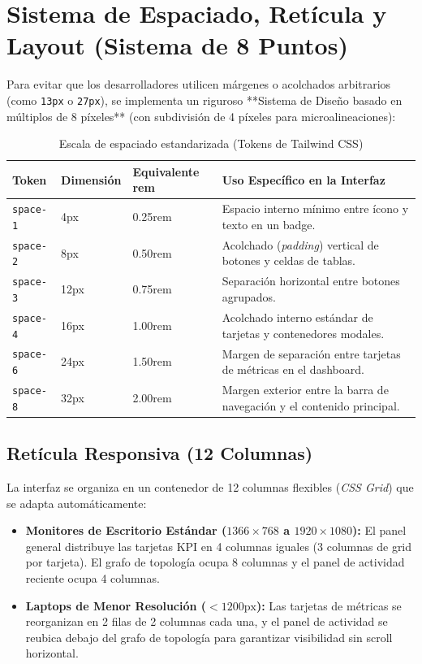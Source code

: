 \documentclass[12pt,a4paper]{report}
\begin{document}
\newpage
\chapter{Sistema de Espaciado, Retícula y Layout (Sistema de 8 Puntos)}

Para evitar que los desarrolladores utilicen márgenes o acolchados arbitrarios (como \texttt{13px} o \texttt{27px}), se implementa un riguroso **Sistema de Diseño basado en múltiplos de 8 píxeles** (con subdivisión de 4 píxeles para microalineaciones):

\begin{table}[htbp]
\centering
\caption{Escala de espaciado estandarizada (Tokens de Tailwind CSS)}\label{tab:espaciado}
\small
\begin{tabularx}{\textwidth}{p{2.2cm} p{2.2cm} p{3.0cm} X}
\toprule
\textbf{Token} & \textbf{Dimensión} & \textbf{Equivalente rem} & \textbf{Uso Específico en la Interfaz} \\
\midrule
\texttt{space-1} & 4px & 0.25rem & Espacio interno mínimo entre ícono y texto en un badge. \\
\midrule
\texttt{space-2} & 8px & 0.50rem & Acolchado (\textit{padding}) vertical de botones y celdas de tablas. \\
\midrule
\texttt{space-3} & 12px & 0.75rem & Separación horizontal entre botones agrupados. \\
\midrule
\texttt{space-4} & 16px & 1.00rem & Acolchado interno estándar de tarjetas y contenedores modales. \\
\midrule
\texttt{space-6} & 24px & 1.50rem & Margen de separación entre tarjetas de métricas en el dashboard. \\
\midrule
\texttt{space-8} & 32px & 2.00rem & Margen exterior entre la barra de navegación y el contenido principal. \\
\bottomrule
\end{tabularx}
\end{table}

\section{Retícula Responsiva (12 Columnas)}
La interfaz se organiza en un contenedor de 12 columnas flexibles (\textit{CSS Grid}) que se adapta automáticamente:
\begin{itemize}
  \item \textbf{Monitores de Escritorio Estándar ($1366 \times 768$ a $1920 \times 1080$):} El panel general distribuye las tarjetas KPI en 4 columnas iguales (3 columnas de grid por tarjeta). El grafo de topología ocupa 8 columnas y el panel de actividad reciente ocupa 4 columnas.
  \item \textbf{Laptops de Menor Resolución ($< 1200\text{px}$):} Las tarjetas de métricas se reorganizan en 2 filas de 2 columnas cada una, y el panel de actividad se reubica debajo del grafo de topología para garantizar visibilidad sin scroll horizontal.
\end{itemize}
\end{document}
